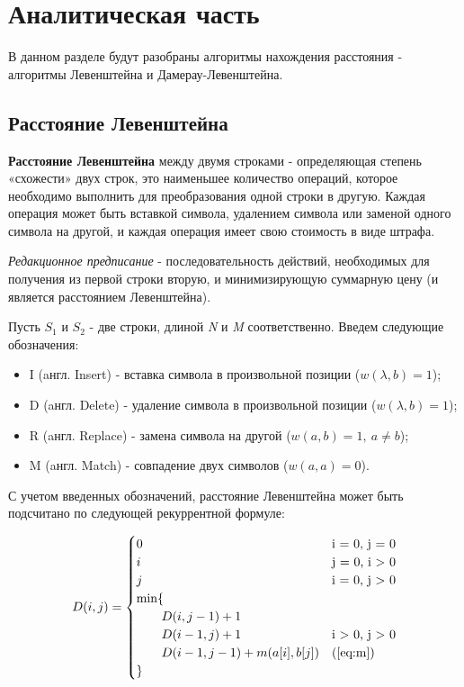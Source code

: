 \chapter{Аналитическая часть}

В данном разделе будут разобраны алгоритмы нахождения расстояния - алгоритмы Левенштейна и Дамерау-Левенштейна.

\section{Расстояние Левенштейна}

\textbf{Расстояние Левенштейна} между двумя строками - определяющая степень «схожести» двух строк, это наименьшее количество операций, которое необходимо выполнить для преобразования одной строки в другую. Каждая операция может быть вставкой символа, удалением символа или заменой одного символа на другой, и каждая операция имеет свою стоимость в виде штрафа.\cite{Levenshtein} \newline


\textit{Редакционное предписание} - последовательность действий, необходимых для получения из первой строки вторую, и минимизирующую суммарную цену (и является расстоянием Левенштейна).\newline


Пусть $S_{1}$ и $S_{2}$ - две строки, длиной \textit{N} и \textit{M} соответственно. Введем следующие обозначения:
\begin{itemize}
	\item I (aнгл. Insert) - вставка символа в произвольной позиции ($w(\lambda,b)=1$);
	\item D (aнгл. Delete) - удаление символа в произвольной позиции ($w(\lambda,b)=1$);
	\item R (aнгл. Replace) - замена символа на другой ($w(a,b)=1, \medspace a \neq b$);
	\item M (aнгл. Match) - совпадение двух символов ($w(a,a)=0$). \newline
\end{itemize} 


С учетом введенных обозначений, расстояние Левенштейна может быть подсчитано по следующей рекуррентной формуле:


\begin{equation}
	\label{eq:D}
	D(i, j) = \begin{cases}
		
		0 &\text{i = 0, j = 0}\\
		i &\text{j = 0, i > 0}\\
		j &\text{i = 0, j > 0}\\
		\min \lbrace \\
		\qquad D(i, j-1) + 1\\
		\qquad D(i-1, j) + 1 &\text{i > 0, j > 0}\\
		\qquad D(i-1, j-1) + m(a[i], b[j]) &\text(\ref{eq:m})\\
		\rbrace
	\end{cases}
\end{equation}


